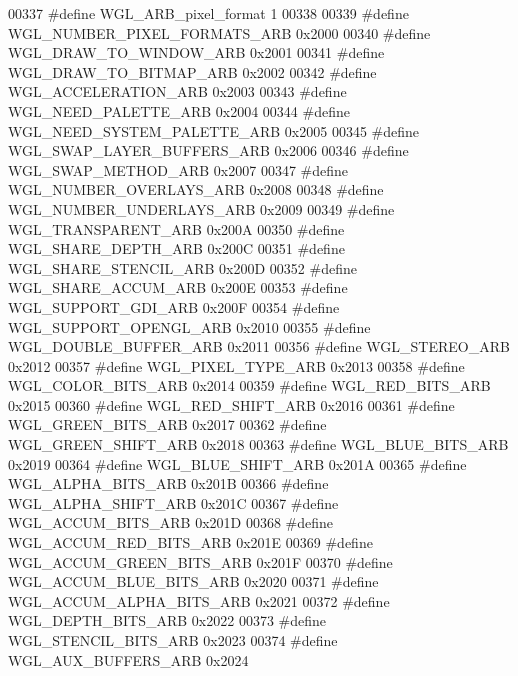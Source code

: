 \begin{DoxyCode}
00337 \textcolor{preprocessor}{#define WGL\_ARB\_pixel\_format 1}
00338 
00339 \textcolor{preprocessor}{#define WGL\_NUMBER\_PIXEL\_FORMATS\_ARB 0x2000}
00340 \textcolor{preprocessor}{#define WGL\_DRAW\_TO\_WINDOW\_ARB 0x2001}
00341 \textcolor{preprocessor}{#define WGL\_DRAW\_TO\_BITMAP\_ARB 0x2002}
00342 \textcolor{preprocessor}{#define WGL\_ACCELERATION\_ARB 0x2003}
00343 \textcolor{preprocessor}{#define WGL\_NEED\_PALETTE\_ARB 0x2004}
00344 \textcolor{preprocessor}{#define WGL\_NEED\_SYSTEM\_PALETTE\_ARB 0x2005}
00345 \textcolor{preprocessor}{#define WGL\_SWAP\_LAYER\_BUFFERS\_ARB 0x2006}
00346 \textcolor{preprocessor}{#define WGL\_SWAP\_METHOD\_ARB 0x2007}
00347 \textcolor{preprocessor}{#define WGL\_NUMBER\_OVERLAYS\_ARB 0x2008}
00348 \textcolor{preprocessor}{#define WGL\_NUMBER\_UNDERLAYS\_ARB 0x2009}
00349 \textcolor{preprocessor}{#define WGL\_TRANSPARENT\_ARB 0x200A}
00350 \textcolor{preprocessor}{#define WGL\_SHARE\_DEPTH\_ARB 0x200C}
00351 \textcolor{preprocessor}{#define WGL\_SHARE\_STENCIL\_ARB 0x200D}
00352 \textcolor{preprocessor}{#define WGL\_SHARE\_ACCUM\_ARB 0x200E}
00353 \textcolor{preprocessor}{#define WGL\_SUPPORT\_GDI\_ARB 0x200F}
00354 \textcolor{preprocessor}{#define WGL\_SUPPORT\_OPENGL\_ARB 0x2010}
00355 \textcolor{preprocessor}{#define WGL\_DOUBLE\_BUFFER\_ARB 0x2011}
00356 \textcolor{preprocessor}{#define WGL\_STEREO\_ARB 0x2012}
00357 \textcolor{preprocessor}{#define WGL\_PIXEL\_TYPE\_ARB 0x2013}
00358 \textcolor{preprocessor}{#define WGL\_COLOR\_BITS\_ARB 0x2014}
00359 \textcolor{preprocessor}{#define WGL\_RED\_BITS\_ARB 0x2015}
00360 \textcolor{preprocessor}{#define WGL\_RED\_SHIFT\_ARB 0x2016}
00361 \textcolor{preprocessor}{#define WGL\_GREEN\_BITS\_ARB 0x2017}
00362 \textcolor{preprocessor}{#define WGL\_GREEN\_SHIFT\_ARB 0x2018}
00363 \textcolor{preprocessor}{#define WGL\_BLUE\_BITS\_ARB 0x2019}
00364 \textcolor{preprocessor}{#define WGL\_BLUE\_SHIFT\_ARB 0x201A}
00365 \textcolor{preprocessor}{#define WGL\_ALPHA\_BITS\_ARB 0x201B}
00366 \textcolor{preprocessor}{#define WGL\_ALPHA\_SHIFT\_ARB 0x201C}
00367 \textcolor{preprocessor}{#define WGL\_ACCUM\_BITS\_ARB 0x201D}
00368 \textcolor{preprocessor}{#define WGL\_ACCUM\_RED\_BITS\_ARB 0x201E}
00369 \textcolor{preprocessor}{#define WGL\_ACCUM\_GREEN\_BITS\_ARB 0x201F}
00370 \textcolor{preprocessor}{#define WGL\_ACCUM\_BLUE\_BITS\_ARB 0x2020}
00371 \textcolor{preprocessor}{#define WGL\_ACCUM\_ALPHA\_BITS\_ARB 0x2021}
00372 \textcolor{preprocessor}{#define WGL\_DEPTH\_BITS\_ARB 0x2022}
00373 \textcolor{preprocessor}{#define WGL\_STENCIL\_BITS\_ARB 0x2023}
00374 \textcolor{preprocessor}{#define WGL\_AUX\_BUFFERS\_ARB 0x2024}

\end{DoxyCode}
